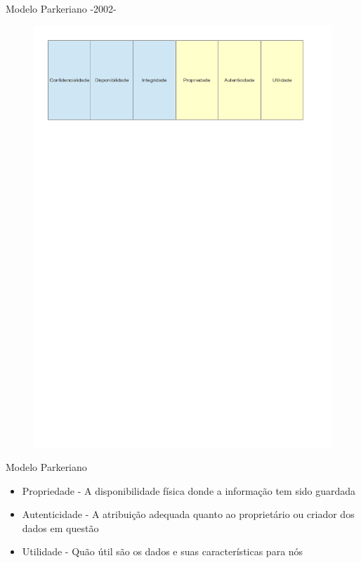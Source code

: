 \documentclass{beamer}
\begin{document}
\begin{frame}{Modelo Parkeriano -2002-}
\begin{figure}[tbph]
\centering
\includegraphics[width=0.90\linewidth]{./parkerian.png}
\label{fig:parkeran}
\end{figure}
\end{frame}

\begin{frame}{Modelo Parkeriano}
\begin{itemize}
\item Propriedade - A disponibilidade física donde a informação tem sido guardada
\item Autenticidade - A atribuição adequada quanto ao proprietário ou criador dos dados em questão
\item Utilidade - Quão útil são os dados e suas características para nós
\end{itemize}
\end{frame}
\end{document}
